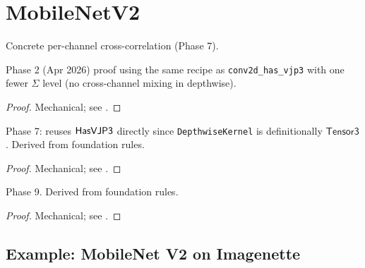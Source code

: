 \chapter{MobileNetV2}
\label{chap:depthwise}

\begin{definition}
  \label{ax:depthwiseConv2d}
  \leanok
  Concrete per-channel cross-correlation (Phase 7).
\end{definition}

\begin{theorem}
  \label{ax:depthwise_has_vjp3}
  \leanok
  Phase 2 (Apr 2026) proof using the same recipe as
  \texttt{conv2d\_has\_vjp3} with one fewer \(\Sigma\) level (no
  cross-channel mixing in depthwise).
\end{theorem}

\begin{proof}
\leanok
Mechanical; see .
\end{proof}

\begin{theorem}
  \label{ax:depthwise_weight_grad_has_vjp3}
  \leanok
  Phase 7: reuses \(\mathsf{HasVJP3}\) directly since \texttt{DepthwiseKernel}
  is definitionally \(\mathsf{Tensor3}\). Derived from foundation rules.
\end{theorem}

\begin{proof}
\leanok
Mechanical; see .
\end{proof}

\begin{theorem}
  \label{ax:depthwise_bias_grad_has_vjp}
  \leanok
  Phase 9. Derived from foundation rules.
\end{theorem}

\begin{proof}
\leanok
Mechanical; see .
\end{proof}

\section{Example: MobileNet V2 on Imagenette}
\label{sec:depthwise_mnv2_example}


